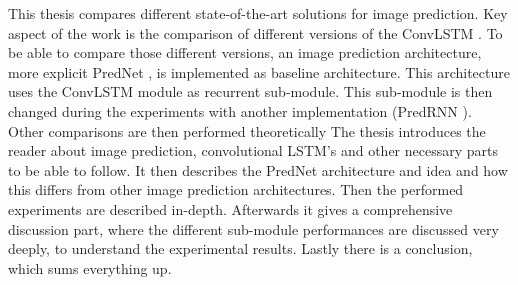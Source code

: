 This thesis compares different state-of-the-art solutions for image prediction. Key aspect of the work is the comparison of different versions
of the ConvLSTM \cite{Shi2015}. To be able to compare those different versions, an image prediction architecture, more explicit PredNet \cite{Lotter2016}, is implemented as baseline architecture.
This architecture uses the ConvLSTM module as recurrent sub-module. This sub-module is then changed during the experiments with another implementation (PredRNN \cite{Wang2017}). Other comparisons
are then performed theoretically The thesis introduces the reader about image prediction,
convolutional LSTM's and other necessary parts to be able to follow. It then describes the PredNet architecture and idea and how this differs from other image prediction architectures. Then the
performed experiments are described in-depth. Afterwards it gives a comprehensive discussion part, where the different sub-module performances are discussed very deeply, to understand the
experimental results. Lastly there is a conclusion, which sums everything up.